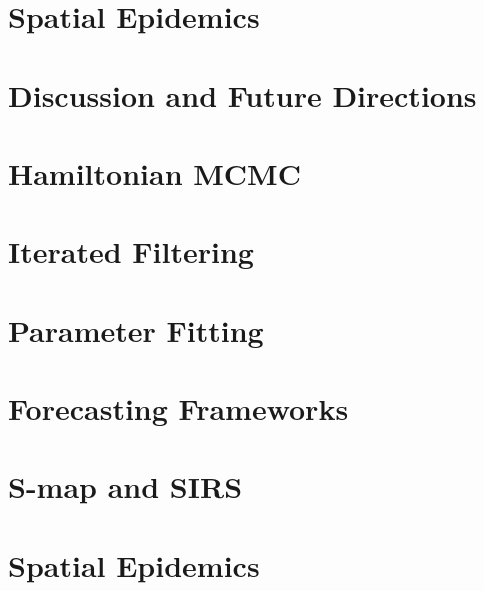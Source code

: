 \documentclass[12pt]{report}
\makeatletter
\let\org@subfile
\renewcommand*{}[1]{%
  \filename@parse{#1}%
  \expandafter
  \graphicspath\expandafter{\expandafter{\filename@area}}%
  \org@subfile{#1}%
}
\makeatother
\begin{document}
\begin{linenumbers}
	\chapter{Spatial Epidemics}

		

	\chapter{Discussion and Future Directions}

		
	
	
	\nocite{*}
	\printbibliography


	\appendix

	\chapter{Hamiltonian MCMC}

		

	\chapter{Iterated Filtering}

		

	\chapter{Parameter Fitting}

		

	\chapter{Forecasting Frameworks}

		

	\chapter{S-map and SIRS}

		

	\chapter{Spatial Epidemics}

		

		


	\end{linenumbers}
	
\end{document}
